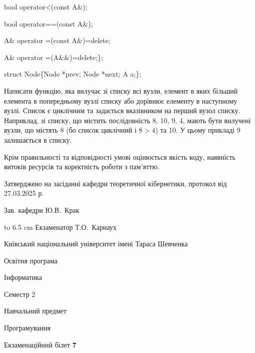 \documentclass[12pt, ukrainian]{article}
\begin{document}
{\quad  bool operator<(const A\&); 

\quad  bool operator==(const A\&); 

\quad A\& operator =(const A\&)=delete; 

\quad  A\& operator =(A\&\&)=delete;\};

struct Node\{Node *prev; Node *next; A a;\};

Написати функцію, яка вилучає зі списку всі вузли, елемент в яких більший елемента в попередньому вузлі списку або дорівнює елементу в наступному вузлі. Список є циклічним та задається вказівником на перший вузол списку. Наприклад, зі списку, що містить послідовність 8, 10, 9, 4, мають бути вилучені вузли, що містять 8 (бо список циклічний і $8>4$) та 10. У цьому прикладі 9 залишається в списку.

Крім правильності та відповідності умові оцінюється якість коду, наявність витоків ресурсів та коректність роботи з пам'яттю. 

}
{\smallskip\smallskip \begin {scriptsize} Затверджено на засіданні кафедри теоретичної кібернетики, протокол   від   27.03.2025 р.\par\smallskip\smallskip\smallskip\smallskip
{\parbox {6.5 cm} {Зав. кафедри \dotfill Ю.В.~Крак}}\hspace {0.7cm} {\hbox to 6.5 cm { Екзаменатор \dotfill Т.О.~Карнаух}} \end{scriptsize}}
\newpage
{{\begin {scriptsize}\par
{ \center  Київський національний університет імені Тараса Шевченка \par}
{\parbox {5 cm}{Освітня програма \hfill}{\parbox {7 cm}{Інформатика\hfill}}\parbox {6 cm}{\hfill Семестр 2}}\par
{\parbox {5 cm} {Навчальний предмет \hfill}\parbox {7 cm}{Програмування \hfill}\parbox {6cm}{\hfill}\par}\vspace{-15pt} \end{scriptsize}}{\center Екзаменаційний білет \No \textbf { 7 }\par}}
\end{document}
